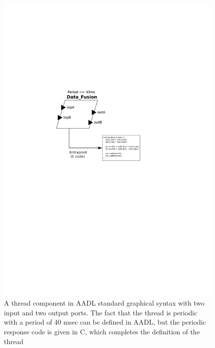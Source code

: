 \begin{figure}
\centering
\includegraphics[scale=0.6]{figs/comp_code}
\caption{A thread component in AADL standard graphical syntax with two
input and two output ports. The fact that the thread is periodic with
a period of 40 msec can be defined in AADL, but the periodic response
code is given in C, which completes the definition of the thread}
\label{fig:comp_code}
\end{figure}

